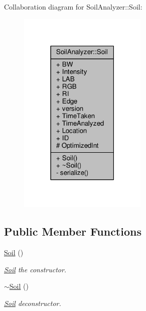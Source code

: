 Collaboration diagram for Soil\+Analyzer\+:\+:Soil\+:\nopagebreak
\begin{figure}[H]
\begin{center}
\leavevmode
\includegraphics[width=174pt]{class_soil_analyzer_1_1_soil__coll__graph}
\end{center}
\end{figure}
\subsection*{Public Member Functions}
\begin{DoxyCompactItemize}
\item 
\hyperlink{class_soil_analyzer_1_1_soil_aee6934dca3d712e86648f92d60e78765}{Soil} ()
\begin{DoxyCompactList}\small\item\em \hyperlink{class_soil_analyzer_1_1_soil}{Soil} the constructor. \end{DoxyCompactList}\item 
\hyperlink{class_soil_analyzer_1_1_soil_aceb78f5d1984d93604f20ad3bc5bef30}{$\sim$\+Soil} ()
\begin{DoxyCompactList}\small\item\em \hyperlink{class_soil_analyzer_1_1_soil}{Soil} deconstructor. \end{DoxyCompactList}\end{DoxyCompactItemize}
